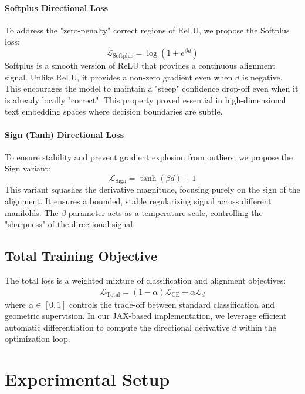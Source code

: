 \documentclass[sigconf,anonymous]{aamas}
\begin{document}
\paragraph{Softplus Directional Loss}
To address the "zero-penalty" correct regions of ReLU, we propose the Softplus loss:
\begin{equation}
    \mathcal{L}_{\text{Softplus}} = \log(1 + e^{\beta d})
\end{equation}
Softplus is a smooth version of ReLU that provides a continuous alignment signal. Unlike ReLU, it provides a non-zero gradient even when $d$ is negative. This encourages the model to maintain a "steep" confidence drop-off even when it is already locally "correct". This property proved essential in high-dimensional text embedding spaces where decision boundaries are subtle.

\paragraph{Sign (Tanh) Directional Loss}
To ensure stability and prevent gradient explosion from outliers, we propose the Sign variant:
\begin{equation}
    \mathcal{L}_{\text{Sign}} = \tanh(\beta d) + 1
\end{equation}
This variant squashes the derivative magnitude, focusing purely on the sign of the alignment. It ensures a bounded, stable regularizing signal across different manifolds. The $\beta$ parameter acts as a temperature scale, controlling the "sharpness" of the directional signal.

\subsection{Total Training Objective}
The total loss is a weighted mixture of classification and alignment objectives:
\begin{align}\label{eq:lambda}
    \mathcal{L}_{\text{Total}} = (1-\alpha)\mathcal{L}_{\textrm{CE}} + \alpha \mathcal{L}_{d}
\end{align}
where $\alpha \in [0,1]$ controls the trade-off between standard classification and geometric supervision. In our JAX-based implementation, we leverage efficient automatic differentiation to compute the directional derivative $d$ within the optimization loop.

\section{Experimental Setup}
\label{sec:experimental_setup}
\end{document}
